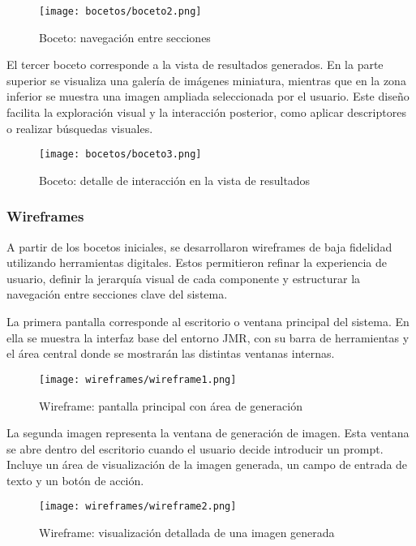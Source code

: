 \begin{figure}[H]
    \centering
    \texttt{[image: bocetos/boceto2.png]}
    \caption{Boceto: navegación entre secciones}
    \label{fig:boceto2}
\end{figure}

El tercer boceto corresponde a la vista de resultados generados. En la parte superior se visualiza una galería de imágenes miniatura, mientras que en la zona inferior se muestra una imagen ampliada seleccionada por el usuario. Este diseño facilita la exploración visual y la interacción posterior, como aplicar descriptores o realizar búsquedas visuales.

\begin{figure}[H]
    \centering
    \texttt{[image: bocetos/boceto3.png]}
    \caption{Boceto: detalle de interacción en la vista de resultados}
    \label{fig:boceto3}
\end{figure}


\subsubsection{Wireframes}

A partir de los bocetos iniciales, se desarrollaron wireframes de baja fidelidad utilizando herramientas digitales. Estos permitieron refinar la experiencia de usuario, definir la jerarquía visual de cada componente y estructurar la navegación entre secciones clave del sistema.

La primera pantalla corresponde al escritorio o ventana principal del sistema. En ella se muestra la interfaz base del entorno JMR, con su barra de herramientas y el área central donde se mostrarán las distintas ventanas internas.

\begin{figure}[H]
    \centering
    \texttt{[image: wireframes/wireframe1.png]}
    \caption{Wireframe: pantalla principal con área de generación}
    \label{fig:wireframe1}
\end{figure}

La segunda imagen representa la ventana de generación de imagen. Esta ventana se abre dentro del escritorio cuando el usuario decide introducir un prompt. Incluye un área de visualización de la imagen generada, un campo de entrada de texto y un botón de acción.

\begin{figure}[H]
    \centering
    \texttt{[image: wireframes/wireframe2.png]}
    \caption{Wireframe: visualización detallada de una imagen generada}
    \label{fig:wireframe3}
\end{figure}

